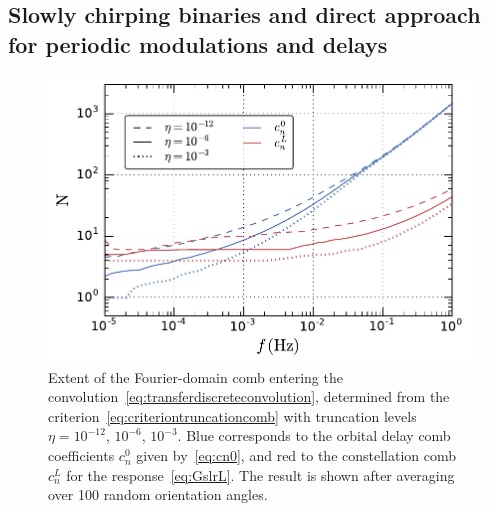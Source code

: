 \documentclass[aps,showpacs,twocolumn,
prd,superscriptaddress,nofootinbib]{revtex4-1}
\begin{document}

\subsection{Slowly chirping binaries and direct approach for periodic modulations and delays}\label{subsec:comblisa}

\begin{figure}
  \centering
  \includegraphics[width=.98\linewidth]{plots/LISACombExtent_py.pdf}
  \caption{Extent of the Fourier-domain comb entering the convolution~\eqref{eq:transferdiscreteconvolution}, determined from the criterion~\eqref{eq:criteriontruncationcomb} with truncation levels $\eta=10^{-12}$, $10^{-6}$, $10^{-3}$. Blue corresponds to the orbital delay comb coefficients $c_{n}^{0}$ given by~\eqref{eq:cn0}, and red to the constellation comb $c_{n}^{L}$ for the response~\eqref{eq:GslrL}. The result is shown after averaging over 100 random orientation angles.}
  \label{fig:lisacombextent}
\end{figure}
\end{document}
